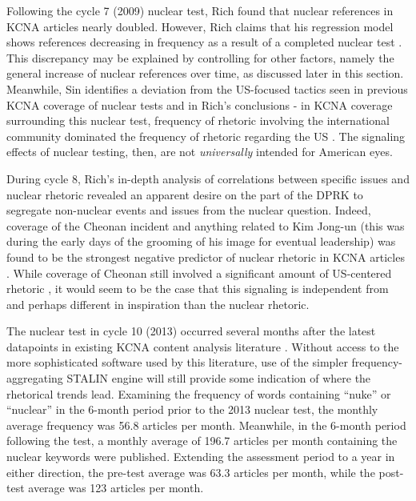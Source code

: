 Following the cycle 7 (2009) nuclear test, Rich found that nuclear references in KCNA articles nearly doubled. However, Rich claims that his regression model shows references decreasing in frequency as a result of a completed nuclear test \cite{rich14}. This discrepancy may be explained by controlling for other factors, namely the general increase of nuclear references over time, as discussed later in this section. Meanwhile, Sin identifies a deviation from the US-focused tactics seen in previous KCNA coverage of nuclear tests and in Rich's conclusions - in KCNA coverage surrounding this nuclear test, frequency of rhetoric involving the international community dominated the frequency of rhetoric regarding the US \cite{sin}. The signaling effects of nuclear testing, then, are not \emph{universally} intended for American eyes.

During cycle 8, Rich's in-depth analysis of correlations between specific issues and nuclear rhetoric revealed an apparent desire on the part of the DPRK to segregate non-nuclear events and issues from the nuclear question. Indeed, coverage of the Cheonan incident and anything related to Kim Jong-un (this was during the early days of the grooming of his image for eventual leadership) was found to be the strongest negative predictor of nuclear rhetoric in KCNA articles \cite{rich12}. While coverage of Cheonan still involved a significant amount of US-centered rhetoric \cite{sin}, it would seem to be the case that this signaling is independent from and perhaps different in inspiration than the nuclear rhetoric.

The nuclear test in cycle 10 (2013) occurred several months after the latest datapoints in existing KCNA content analysis literature \cite{rich14}. Without access to the more sophisticated software used by this literature, use of the simpler frequency-aggregating STALIN engine will still provide some indication of where the rhetorical trends lead. Examining the frequency of words containing ``nuke'' or ``nuclear'' in the 6-month period prior to the 2013 nuclear test, the monthly average frequency was 56.8 articles per month. Meanwhile, in the 6-month period following the test, a monthly average of 196.7 articles per month containing the nuclear keywords were published. Extending the assessment period to a year in either direction, the pre-test average was 63.3 articles per month, while the post-test average was 123 articles per month.


